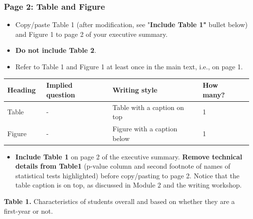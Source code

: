 \documentclass[
  openany]{book}
\providecommand{\tightlist}{%
  \setlength{\itemsep}{0pt}\setlength{\parskip}{0pt}}
\begin{document}
\hypertarget{page-2-table-and-figure}{%
\subsubsection{Page 2: Table and Figure}\label{page-2-table-and-figure}}

\begin{itemize}
\item
  Copy/paste Table 1 (after modification, see "\textbf{Include Table 1"} bullet below) and Figure 1 to page 2 of your executive summary.
\item
  \textbf{Do not include Table 2}.
\item
  Refer to Table 1 and Figure 1 at least once in the main text, i.e., on page 1.
\end{itemize}

\begin{longtable}[]{@{}llll@{}}
\toprule
\textbf{Heading}~ & \textbf{Implied question}~ & \textbf{Writing style}~ & \textbf{How many?}~ \\
\midrule
\endhead
Table~ & -~ & Table with a caption on top~ & 1~~ \\
Figure~ & -~ & Figure with a caption below~ & 1~ \\
\bottomrule
\end{longtable}

\begin{itemize}
\tightlist
\item
  \textbf{Include Table 1} on page 2 of the executive summary. \textbf{Remove technical details from Table1} (p-value column and second footnote of names of statistical tests highlighted) before copy/pasting to page 2. Notice that the table caption is on top, as discussed in Module 2 and the writing workshop.
\end{itemize}

\textbf{Table 1.} Characteristics of students overall and based on whether they are a first-year or not.
\end{document}
